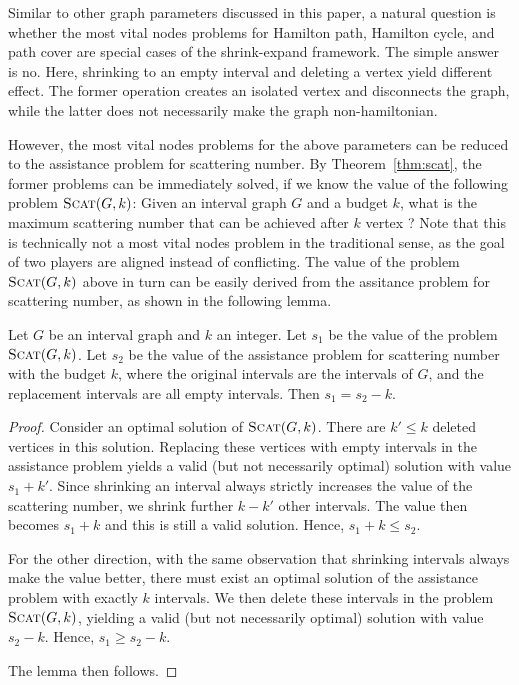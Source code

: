 Similar to other graph parameters discussed in this paper, a natural question is whether the most vital nodes problems for Hamilton path, Hamilton cycle, and path cover are special cases of the shrink-expand framework.
The simple answer is no.
Here, shrinking to an empty interval and deleting a vertex yield different effect.
The former operation creates an isolated vertex and disconnects the graph, while the latter does not necessarily make the graph non-hamiltonian.

However, the most vital nodes problems for the above parameters can be reduced to the assistance problem for scattering number.
By Theorem~\ref{thm:scat}, the former problems can be immediately solved, if we know the value of the following problem $\textsc{Scat}(G,k)$: Given an interval graph $G$ and a budget $k$, what is the maximum scattering number that can be achieved after $k$ vertex ?
Note that this is technically not a most vital nodes problem in the traditional sense, as the goal of two players are aligned instead of conflicting.
The value of the problem $\textsc{Scat}(G,k)$ above in turn can be easily derived from the assitance problem for scattering number, as shown in the following lemma.

\begin{lemma}
Let $G$ be an interval graph and $k$ an integer.
Let $s_1$ be the value of the problem $\textsc{Scat}(G,k)$.
Let $s_2$ be the value of the assistance problem for scattering number with the budget $k$, where the original intervals are the intervals of $G$, and the replacement intervals are all empty intervals.
Then $s_1 = s_2 - k$.
\end{lemma}
\begin{proof}
Consider an optimal solution of $\textsc{Scat}(G,k)$.
There are $k' \leq k$ deleted vertices in this solution.
Replacing these vertices with empty intervals in the assistance problem yields a valid (but not necessarily optimal) solution with value $s_1 + k'$.
Since shrinking an interval always strictly increases the value of the scattering number, we shrink further $k - k'$ other intervals.
The value then becomes $s_1 + k$ and this is still a valid solution.
Hence, $s_1 + k \leq s_2$.

For the other direction, with the same observation that shrinking intervals always make the value better, there must exist an optimal solution of the assistance problem with exactly $k$  intervals.
We then delete these intervals in the problem $\textsc{Scat}(G,k)$, yielding a valid (but not necessarily optimal) solution with value $s_2 - k$.
Hence, $s_1 \geq s_2 - k$.

The lemma then follows. 
\end{proof}

